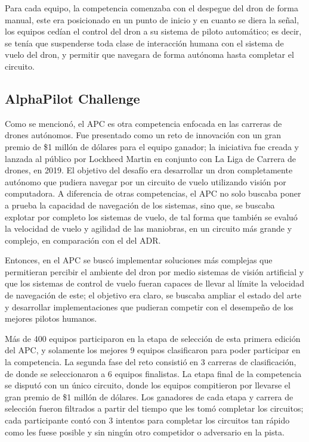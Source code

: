 Para cada equipo, la competencia comenzaba con el despegue del dron de forma manual, este era posicionado en un punto de inicio y en cuanto se diera la señal, los equipos cedían el control del dron a su sistema de piloto automático; es decir, se tenía que suspenderse toda clase de interacción humana con el sistema de vuelo del dron, y permitir que navegara de forma autónoma hasta completar el circuito. 



\subsection{AlphaPilot Challenge}
Como se mencionó, el APC es otra competencia enfocada en las carreras de drones autónomos. Fue presentado como un reto de innovación con un gran premio de \$1 millón de dólares para el equipo ganador; la iniciativa fue creada y lanzada al público por Lockheed Martin en conjunto con La Liga de Carrera de drones, en 2019. El objetivo del desafío era desarrollar un dron completamente autónomo que pudiera navegar por un circuito de vuelo utilizando visión por computadora. A diferencia de otras competencias, el APC no solo buscaba poner a prueba la capacidad de navegación de los sistemas, sino que, se buscaba explotar por completo los sistemas de vuelo, de tal forma que también se evaluó la velocidad de vuelo y agilidad de las maniobras, en un circuito más grande y complejo, en comparación con el del ADR. 

Entonces, en el APC se buscó implementar soluciones más complejas que permitieran percibir el ambiente del dron por medio sistemas de visión artificial y que los sistemas de control de vuelo fueran capaces de llevar al límite la velocidad de navegación de este; el objetivo era claro, se buscaba ampliar el estado del arte y desarrollar implementaciones que pudieran competir con el desempeño de los mejores pilotos humanos. 

Más de 400 equipos participaron en la etapa de selección de esta primera edición del APC, y solamente los mejores 9 equipos clasificaron para poder participar en la competencia. La segunda fase del reto consistió en 3 carreras de clasificación, de donde se seleccionaron a 6 equipos finalistas. La etapa final de la competencia se disputó con un único circuito, donde los equipos compitieron por llevarse el gran premio de \$1 millón de dólares. Los ganadores de cada etapa y carrera de selección fueron filtrados a partir del tiempo que les tomó completar los circuitos; cada participante contó con 3 intentos para completar los circuitos tan rápido como les fuese posible y sin ningún otro competidor o adversario en la pista.

